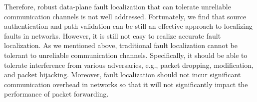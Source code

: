 Therefore, robust data-plane fault localization that can tolerate unreliable communication channels is not well addressed. Fortunately, we find that source authentication and path validation can be still an effective approach to localizing faults in networks. %
However, it is still not easy to realize accurate fault localization. As we mentioned above, traditional fault localization cannot be tolerant to unreliable communication channels. Specifically, it should be able to tolerate interference from various adversaries, e.g., packet dropping, modification, and packet hijacking. %
Moreover, fault localization should not incur significant communication overhead in networks so that it will not significantly impact the performance of packet forwarding. %
